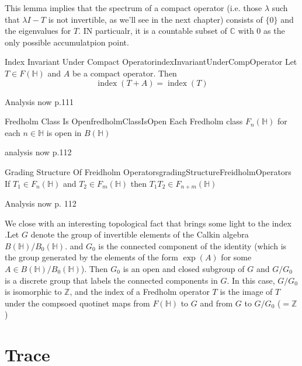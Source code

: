 \documentclass[oneside]{book}
\newcommand{\Z}{\mathbb{Z}}
\newcommand{\C}{\mathbb{C}}
\renewcommand{\H}{\mathbb{H}}
\renewcommand{\index}{\operatorname{index}}
\begin{document}
This lemma implies that the spectrum of a compact operator (i.e. those $\lambda$ such that $\lambda I - T$ is not
invertible, as we'll see in the next chapter) consists of $\{0\}$ and the eigenvalues for $T$. IN particualr, it
is a countable subset of $\C$ with $0$ as the only possible accumulatpion point.


\begin{thm}{Index Invariant Under Compact Operator}{indexInvariantUnderCompOperator}
	Let $T \in F(\H)$ and $A$ be a compact operator. Then
	\[
		\index(T+A) = \index(T)
	\]
\end{thm}

\begin{Proof}
	Analysis now p.111
\end{Proof}

\begin{prop}{Fredholm Class Is Open}{fredholmClassIsOpen}
	Each Fredholm class $F_n(\H)$ for each $n \in \H$ is open in $B(\H)$
\end{prop}

\begin{Proof}
	analysis now p.112
\end{Proof}

\begin{prop}{Grading Structure Of Freidholm Operators}{gradingStructureFreidholmOperators}
	If $T_1 \in F_n(\H)$ and $T_2 \in F_m(\H)$ then $T_1T_2 \in F_{n+m}(\H)$
\end{prop}

\begin{Proof}
	Analysis now p. 112
\end{Proof}

We close with an interesting topological fact that brings some light to the index .Let $G$ denote the group of
invertible elements of the Calkin algebra $B(\H)/B_0(\H)$. and $G_0$ is the connected component of the identity (which
is the group generated by the elements of the form $\exp(A)$ for some $A \in B(\H)/B_0(\H)$). Then $G_0$ is an open and
closed subgroup of $G$ and $G/G_0$ is a discrete group that labels the connected components in $G$. In this case,
$G/G_0$ is isomorphic to $\Z$, and the index of a Fredholm operator $T$ is the image of $T$ under the compsoed
quotinet maps from $F(\H)$ to $G$ and from $G$ to $G/G_0$ ($= \Z$)


\section{Trace}
\end{document}
